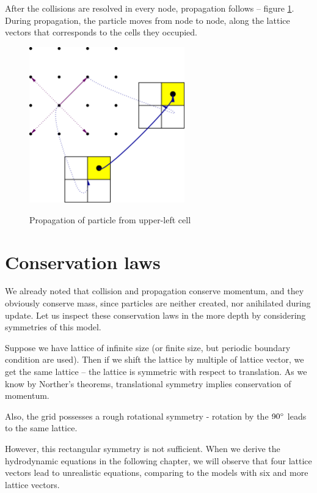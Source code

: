 After the collisions are resolved in every node, propagation follows -- figure \ref{hpp-prop}.
During propagation, the particle moves from node to node, along the lattice vectors that corresponds to the cells they occupied.
\begin{figure} [H]
 \centering
 \includegraphics[width=0.6\textwidth]{./img/HPPprop}
 \label{hpp-prop}
 \caption{Propagation of particle from upper-left cell}
\end{figure}

\bigskip

\section{Conservation laws}

We already noted that collision and propagation conserve momentum, and they obviously conserve mass, since particles are neither created, nor anihilated during update. 
Let us inspect these conservation laws in the more depth by considering symmetries of this model.

Suppose we have lattice of infinite size (or finite size, but periodic boundary condition are used). Then if we shift the lattice by multiple of lattice vector, we get the same lattice -- the lattice is symmetric with respect to translation.
As we know by Norther's theorems, translational symmetry implies conservation of momentum.

\bigskip

Also, the grid possesses a rough rotational symmetry - rotation by the $90\degree$ leads to the same lattice.

However, this rectangular symmetry is not sufficient.
When we derive the hydrodynamic equations in the following chapter, we will observe that four lattice vectors lead to unrealistic equations, comparing to the models with six and more lattice vectors.

